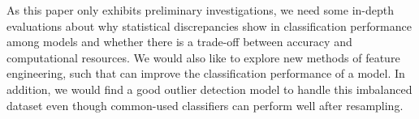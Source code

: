 As this paper only exhibits preliminary investigations, we need some in-depth evaluations about why statistical discrepancies show in classification performance among models and whether there is a trade-off between accuracy and computational resources. We would also like to explore new methods of feature engineering, such that can improve the classification performance of a model. In addition, we would find a good outlier detection model to handle this imbalanced dataset even though common-used classifiers can perform well after resampling.






%
%



